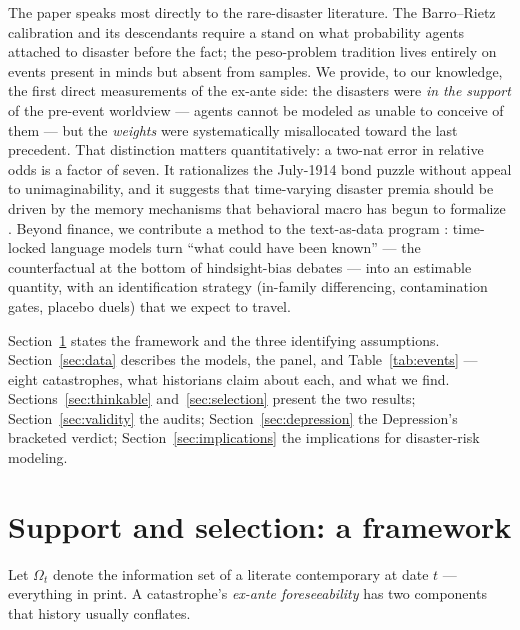 \documentclass[11pt]{article}
\begin{document}
The paper speaks most directly to the rare-disaster literature. The Barro--Rietz calibration and its
descendants \citep{barroursua2008,gabaix2012,wachter2013} require a stand on what probability agents attached
to disaster before the fact; the peso-problem tradition \citep{krasker1980} lives entirely on events present
in minds but absent from samples. We provide, to our knowledge, the first direct measurements of the ex-ante
side: the disasters were \emph{in the support} of the pre-event worldview --- agents cannot be modeled as
unable to conceive of them --- but the \emph{weights} were systematically misallocated toward the last
precedent. That distinction matters quantitatively: a two-nat error in relative odds is a factor of seven.
It rationalizes the July-1914 bond puzzle \citep{ferguson2006} without appeal to unimaginability, and it
suggests that time-varying disaster premia \citep{gabaix2012,wachter2013} should be driven by the memory
mechanisms that behavioral macro has begun to formalize \citep{bordalo2018}. Beyond finance, we contribute a
method to the text-as-data program \citep{gentzkow2019}: time-locked language models turn ``what could have
been known'' --- the counterfactual at the bottom of hindsight-bias debates \citep{kuran1991,tetlock2005,taleb2007}
--- into an estimable quantity, with an identification strategy (in-family differencing, contamination gates,
placebo duels) that we expect to travel.

Section~\ref{sec:framework} states the framework and the three identifying assumptions.
Section~\ref{sec:data} describes the models, the panel, and Table~\ref{tab:events} --- eight catastrophes,
what historians claim about each, and what we find. Sections~\ref{sec:thinkable} and~\ref{sec:selection}
present the two results; Section~\ref{sec:validity} the audits; Section~\ref{sec:depression} the Depression's
bracketed verdict; Section~\ref{sec:implications} the implications for disaster-risk modeling.

\section{Support and selection: a framework}\label{sec:framework}

Let $\Omega_t$ denote the information set of a literate contemporary at date $t$ --- everything in print.
A catastrophe's \emph{ex-ante foreseeability} has two components that history usually conflates.
\end{document}
